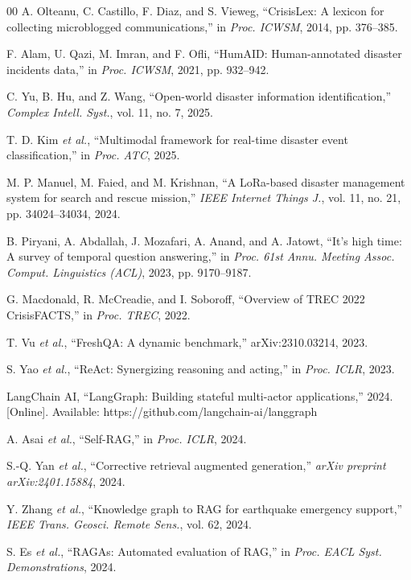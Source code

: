 \documentclass[conference]{IEEEtran}
\begin{document}
\begin{thebibliography}{00}
 A. Olteanu, C. Castillo, F. Diaz, and S. Vieweg, ``CrisisLex: A lexicon for collecting microblogged communications,'' in \textit{Proc. ICWSM}, 2014, pp. 376--385.

 F. Alam, U. Qazi, M. Imran, and F. Ofli, ``HumAID: Human-annotated disaster incidents data,'' in \textit{Proc. ICWSM}, 2021, pp. 932--942.

 C. Yu, B. Hu, and Z. Wang, ``Open-world disaster information identification,'' \textit{Complex Intell. Syst.}, vol. 11, no. 7, 2025.

 T. D. Kim \textit{et al.}, ``Multimodal framework for real-time disaster event classification,'' in \textit{Proc. ATC}, 2025.


 M. P. Manuel, M. Faied, and M. Krishnan, ``A LoRa-based disaster management system for search and rescue mission,'' \textit{IEEE Internet Things J.}, vol. 11, no. 21, pp. 34024--34034, 2024.

 B. Piryani, A. Abdallah, J. Mozafari, A. Anand, and A. Jatowt, ``It's high time: A survey of temporal question answering,'' in \textit{Proc. 61st Annu. Meeting Assoc. Comput. Linguistics (ACL)}, 2023, pp. 9170--9187.

 G. Macdonald, R. McCreadie, and I. Soboroff, ``Overview of TREC 2022 CrisisFACTS,'' in \textit{Proc. TREC}, 2022.

 T. Vu \textit{et al.}, ``FreshQA: A dynamic benchmark,'' arXiv:2310.03214, 2023.

 S. Yao \textit{et al.}, ``ReAct: Synergizing reasoning and acting,'' in \textit{Proc. ICLR}, 2023.

 LangChain AI, ``LangGraph: Building stateful multi-actor applications,'' 2024. [Online]. Available: https://github.com/langchain-ai/langgraph

 A. Asai \textit{et al.}, ``Self-RAG,'' in \textit{Proc. ICLR}, 2024.

 S.-Q. Yan \textit{et al.}, ``Corrective retrieval augmented generation,'' \textit{arXiv preprint arXiv:2401.15884}, 2024.

 Y. Zhang \textit{et al.}, ``Knowledge graph to RAG for earthquake emergency support,'' \textit{IEEE Trans. Geosci. Remote Sens.}, vol. 62, 2024.

 S. Es \textit{et al.}, ``RAGAs: Automated evaluation of RAG,'' in \textit{Proc. EACL Syst. Demonstrations}, 2024.


\end{thebibliography}
\end{document}
